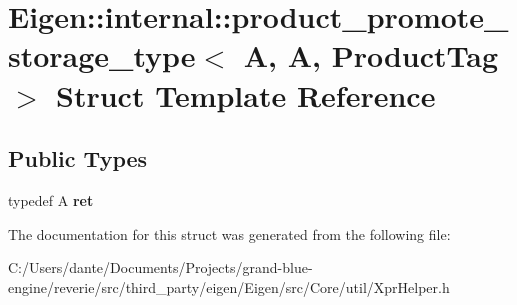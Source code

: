 \hypertarget{struct_eigen_1_1internal_1_1product__promote__storage__type_3_01_a_00_01_a_00_01_product_tag_01_4}{}\section{Eigen\+::internal\+::product\+\_\+promote\+\_\+storage\+\_\+type$<$ A, A, Product\+Tag $>$ Struct Template Reference}
\label{struct_eigen_1_1internal_1_1product__promote__storage__type_3_01_a_00_01_a_00_01_product_tag_01_4}
\subsection*{Public Types}
\begin{DoxyCompactItemize}
\item 
\mbox{\label{struct_eigen_1_1internal_1_1product__promote__storage__type_3_01_a_00_01_a_00_01_product_tag_01_4_a5cc1615a8e7ee8a6ddcb6078520b7886}} 
typedef A {\bfseries ret}
\end{DoxyCompactItemize}


The documentation for this struct was generated from the following file\+:\begin{DoxyCompactItemize}
\item 
C\+:/\+Users/dante/\+Documents/\+Projects/grand-\/blue-\/engine/reverie/src/third\+\_\+party/eigen/\+Eigen/src/\+Core/util/Xpr\+Helper.\+h\end{DoxyCompactItemize}
